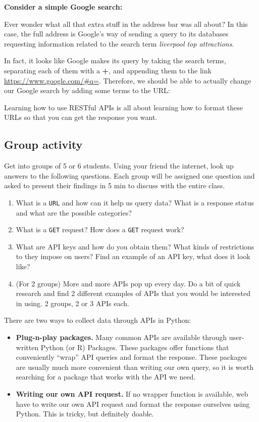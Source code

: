 \documentclass[
  letterpaper,
  DIV=11,
  numbers=noendperiod]{scrreprt}
\providecommand{\tightlist}{%
  \setlength{\itemsep}{0pt}\setlength{\parskip}{0pt}}\usepackage{longtable,booktabs,array}
\begin{document}
\textbf{Consider a simple Google search:}

Ever wonder what all that extra stuff in the address bar was all about?
In this case, the full address is Google's way of sending a query to its
databases requesting information related to the search term
\emph{liverpool top attractions}.

In fact, it looks like Google makes its query by taking the search
terms, separating each of them with a \textbf{+}, and appending them to
the link \url{https://www.google.com/\#q=}. Therefore, we should be able
to actually change our Google search by adding some terms to the URL:

Learning how to use RESTful APIs is all about learning how to format
these URLs so that you can get the response you want.

\subsection{Group activity}\label{group-activity}

Get into groups of 5 or 6 students. Using your friend the internet, look
up answers to the following questions. Each group will be assigned one
question and asked to present their findings in 5 min to discuss with
the entire class.

\begin{enumerate}
\def\labelenumi{\arabic{enumi}.}
\tightlist
\item
  What is a \texttt{URL} and how can it help us query data? What is a
  response status and what are the possible categories?
\item
  What is a \texttt{GET} request? How does a \texttt{GET} request work?
\item
  What are API keys and how do you obtain them? What kinds of
  restrictions to they impose on users? Find an example of an API key,
  what does it look like?
\item
  (For 2 groups) More and more APIs pop up every day. Do a bit of quick
  research and find 2 different examples of APIs that you would be
  interested in using. 2 groups, 2 or 3 APIs each.
\end{enumerate}

There are two ways to collect data through APIs in Python:

\begin{itemize}
\tightlist
\item
  \textbf{Plug-n-play packages.} Many common APIs are available through
  user-written Python (or R) Packages. These packages offer functions
  that conveniently ``wrap'' API queries and format the response. These
  packages are usually much more convenient than writing our own query,
  so it is worth searching for a package that works with the API we
  need.
\item
  \textbf{Writing our own API request.} If no wrapper function is
  available, web have to write our own API request and format the
  response ourselves using Python. This is tricky, but definitely
  doable.
\end{itemize}
\end{document}
